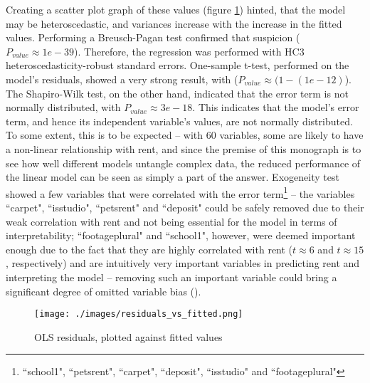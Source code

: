 \documentclass[12pt]{report}
\begin{document}
Creating a scatter plot graph of these values (figure \ref{fig:heteroscedasticity}) hinted, that the model may be heteroscedastic, and variances increase with the increase in the fitted values. Performing a Breusch-Pagan test confirmed that suspicion ($P_{value}\approx1e-39$). Therefore, the regression was performed with HC3 heteroscedasticity-robust standard errors. One-sample t-test, performed on the model's residuals, showed a very strong result, with ($P_{value}\approx(1-(1e-12)$). The Shapiro-Wilk test, on the other hand, indicated that the error term is not normally distributed, with $P_{value}\approx3e-18$. This indicates that the model's error term, and hence its independent variable's values, are not normally distributed. To some extent, this is to be expected -- with 60 variables, some are likely to have a non-linear relationship with rent, and since the premise of this monograph is to see how well different models untangle complex data, the reduced performance of the linear model can be seen as simply a part of the answer. Exogeneity test showed a few variables that were correlated with the error term\footnote{``school1", ``pets\textunderscore rent", ``carpet", ``deposit", ``is\textunderscore studio" and ``footageplural"} -- the variables ``carpet", ``is\textunderscore studio", ``pets\textunderscore rent" and ``deposit" could be safely removed due to their weak correlation with rent and not being essential for the model in terms of interpretability; ``footageplural" and ``school1", however, were deemed important enough due to the fact that they are highly correlated with rent ($t\approx6$ and $t\approx15$, respectively) and are intuitively very important variables in predicting rent and interpreting the model -- removing such an important variable could bring a significant degree of omitted variable bias (\cite{walsch2021}).

\begin{figure}[ht]
	\centering
	\texttt{[image: ./images/residuals\_vs\_fitted.png]}
	\caption{OLS residuals, plotted against fitted values}
	\label{fig:heteroscedasticity}
\end{figure}
\end{document}
